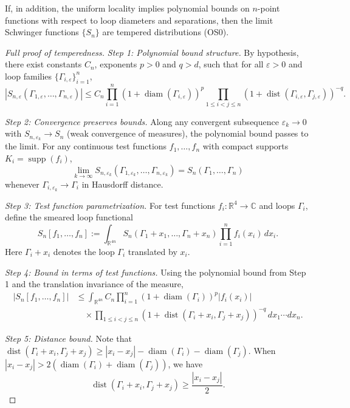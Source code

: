 \documentclass[11pt]{amsart}
\begin{document}
\begin{lemma}
If, in addition, the uniform locality implies polynomial bounds on $n$-point functions with respect to loop diameters and separations, then the limit Schwinger functions $\{S_n\}$ are tempered distributions (OS0).
\end{lemma}

\begin{proof}[Full proof of temperedness]
\emph{Step 1: Polynomial bound structure.} By hypothesis, there exist constants $C_n$, exponents $p > 0$ and $q > d$, such that for all $\varepsilon > 0$ and loop families $\{\Gamma_{i,\varepsilon}\}_{i=1}^n$,
\[
  |S_{n,\varepsilon}(\Gamma_{1,\varepsilon}, \ldots, \Gamma_{n,\varepsilon})| \le C_n \prod_{i=1}^n (1 + \operatorname{diam}(\Gamma_{i,\varepsilon}))^p \prod_{1 \le i < j \le n} (1 + \operatorname{dist}(\Gamma_{i,\varepsilon}, \Gamma_{j,\varepsilon}))^{-q}.
\]

\emph{Step 2: Convergence preserves bounds.} Along any convergent subsequence $\varepsilon_k \to 0$ with $S_{n,\varepsilon_k} \to S_n$ (weak convergence of measures), the polynomial bound passes to the limit. For any continuous test functions $f_1, \ldots, f_n$ with compact supports $K_i = \operatorname{supp}(f_i)$,
\[
  \lim_{k \to \infty} S_{n,\varepsilon_k}(\Gamma_{1,\varepsilon_k}, \ldots, \Gamma_{n,\varepsilon_k}) = S_n(\Gamma_1, \ldots, \Gamma_n)
\]
whenever $\Gamma_{i,\varepsilon_k} \to \Gamma_i$ in Hausdorff distance.

\emph{Step 3: Test function parametrization.} For test functions $f_i: \mathbb{R}^4 \to \mathbb{C}$ and loops $\Gamma_i$, define the smeared loop functional
\[
  S_n[f_1, \ldots, f_n] := \int_{\mathbb{R}^{4n}} S_n(\Gamma_1 + x_1, \ldots, \Gamma_n + x_n) \prod_{i=1}^n f_i(x_i) \, dx_i.
\]
Here $\Gamma_i + x_i$ denotes the loop $\Gamma_i$ translated by $x_i$.

\emph{Step 4: Bound in terms of test functions.} Using the polynomial bound from Step 1 and the translation invariance of the measure,
\begin{align}
  |S_n[f_1, \ldots, f_n]| &\le \int_{\mathbb{R}^{4n}} C_n \prod_{i=1}^n (1 + \operatorname{diam}(\Gamma_i))^p |f_i(x_i)| \\
  &\quad \times \prod_{1 \le i < j \le n} (1 + \operatorname{dist}(\Gamma_i + x_i, \Gamma_j + x_j))^{-q} \, dx_1 \cdots dx_n.
\end{align}

\emph{Step 5: Distance bound.} Note that $\operatorname{dist}(\Gamma_i + x_i, \Gamma_j + x_j) \ge |x_i - x_j| - \operatorname{diam}(\Gamma_i) - \operatorname{diam}(\Gamma_j)$. When $|x_i - x_j| > 2(\operatorname{diam}(\Gamma_i) + \operatorname{diam}(\Gamma_j))$, we have
\[
  \operatorname{dist}(\Gamma_i + x_i, \Gamma_j + x_j) \ge \frac{|x_i - x_j|}{2}.
\]


\end{proof}
\end{document}
